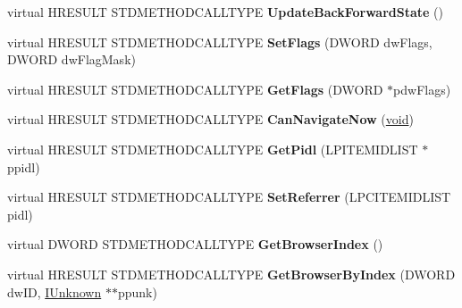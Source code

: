 \begin{DoxyCompactItemize}
virtual H\+R\+E\+S\+U\+LT S\+T\+D\+M\+E\+T\+H\+O\+D\+C\+A\+L\+L\+T\+Y\+PE {\bfseries Update\+Back\+Forward\+State} ()
\item 
\mbox{\label{class_c_shell_browser_a43667ac4799a6a3e3c1a771613781b34}} 
virtual H\+R\+E\+S\+U\+LT S\+T\+D\+M\+E\+T\+H\+O\+D\+C\+A\+L\+L\+T\+Y\+PE {\bfseries Set\+Flags} (D\+W\+O\+RD dw\+Flags, D\+W\+O\+RD dw\+Flag\+Mask)
\item 
\mbox{\label{class_c_shell_browser_a167e15cb304eab72d01f537e6251e848}} 
virtual H\+R\+E\+S\+U\+LT S\+T\+D\+M\+E\+T\+H\+O\+D\+C\+A\+L\+L\+T\+Y\+PE {\bfseries Get\+Flags} (D\+W\+O\+RD $\ast$pdw\+Flags)
\item 
\mbox{\label{class_c_shell_browser_ac35b8603194bfd06c35d430742a982fb}} 
virtual H\+R\+E\+S\+U\+LT S\+T\+D\+M\+E\+T\+H\+O\+D\+C\+A\+L\+L\+T\+Y\+PE {\bfseries Can\+Navigate\+Now} (\hyperlink{interfacevoid}{void})
\item 
\mbox{\label{class_c_shell_browser_aca4d4707c9bfcdd2462f9a1dd0ae098b}} 
virtual H\+R\+E\+S\+U\+LT S\+T\+D\+M\+E\+T\+H\+O\+D\+C\+A\+L\+L\+T\+Y\+PE {\bfseries Get\+Pidl} (L\+P\+I\+T\+E\+M\+I\+D\+L\+I\+ST $\ast$ppidl)
\item 
\mbox{\label{class_c_shell_browser_a85ad53da2a382e2879180f901289e56d}} 
virtual H\+R\+E\+S\+U\+LT S\+T\+D\+M\+E\+T\+H\+O\+D\+C\+A\+L\+L\+T\+Y\+PE {\bfseries Set\+Referrer} (L\+P\+C\+I\+T\+E\+M\+I\+D\+L\+I\+ST pidl)
\item 
\mbox{\label{class_c_shell_browser_a278f399351c083c728d80c29c1963561}} 
virtual D\+W\+O\+RD S\+T\+D\+M\+E\+T\+H\+O\+D\+C\+A\+L\+L\+T\+Y\+PE {\bfseries Get\+Browser\+Index} ()
\item 
\mbox{\label{class_c_shell_browser_a56e1dd1dfc38ec5bd1a22360b888b9b7}} 
virtual H\+R\+E\+S\+U\+LT S\+T\+D\+M\+E\+T\+H\+O\+D\+C\+A\+L\+L\+T\+Y\+PE {\bfseries Get\+Browser\+By\+Index} (D\+W\+O\+RD dw\+ID, \hyperlink{interface_i_unknown}{I\+Unknown} $\ast$$\ast$ppunk)
\item 
\mbox{\label{class_c_shell_browser_ac1e4c47325430944289e223da8c68922}} 
$$
\end{DoxyCompactItemize}
